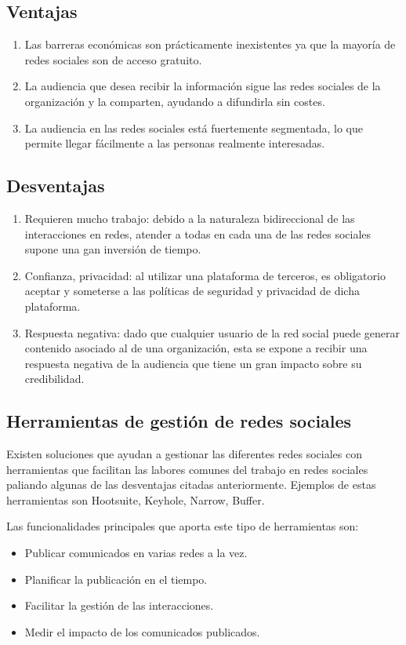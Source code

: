 \subsection*{Ventajas}
\begin{enumerate}
    \item Las barreras económicas son prácticamente inexistentes ya que la mayoría de redes sociales son de acceso gratuito. 
    \item La audiencia que desea recibir la información sigue las redes sociales de la organización y la comparten, ayudando a difundirla sin costes.
    \item La audiencia en las redes sociales está fuertemente segmentada, lo que permite llegar fácilmente a las personas realmente interesadas.
\end{enumerate}

\subsection*{Desventajas}
\begin{enumerate}
    \item Requieren mucho trabajo: debido a la naturaleza bidireccional de las interacciones en redes, atender a todas en cada una de las redes sociales supone una gan inversión de tiempo.
    \item Confianza, privacidad: al utilizar una plataforma de terceros, es obligatorio aceptar y someterse a las políticas de seguridad y privacidad de dicha plataforma.
    \item Respuesta negativa: dado que cualquier usuario de la red social puede generar contenido asociado al de una organización, esta se expone a recibir una respuesta negativa de la audiencia que tiene un gran impacto sobre su credibilidad.
\end{enumerate}

\subsection{Herramientas de gestión de redes sociales}
Existen soluciones que ayudan a gestionar las diferentes redes sociales con herramientas que facilitan las labores comunes del trabajo en redes sociales \cite{herramientas-social-media-1} \cite{herramientas-social-media-2} paliando algunas de las desventajas citadas anteriormente. Ejemplos de estas herramientas son Hootsuite, Keyhole, Narrow, Buffer. 

Las funcionalidades principales que aporta este tipo de herramientas son:
\begin{itemize}
    \item Publicar comunicados en varias redes a la vez.
    \item Planificar la publicación en el tiempo.
    \item Facilitar la gestión de las interacciones.
    \item Medir el impacto de los comunicados publicados.
\end{itemize}